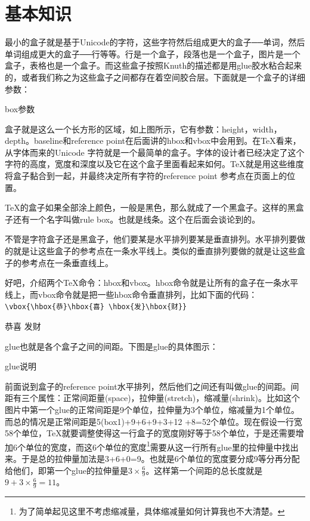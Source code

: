 \documentclass[11pt,oneside]{book}
\begin{document}
\section{基本知识}
最小的盒子就是基于Unicode的字符，这些字符然后组成更大的盒子──单词，然后单词组成更大的盒子──行等等。行是一个盒子，段落也是一个盒子，图片是一个盒子，表格也是一个盒子。而这些盒子按照Knuth的描述都是用glue胶水粘合起来的，或者我们称之为这些盒子之间都存在着空间胶合层。下面就是一个盒子的详细参数：

\begin{linefig}[0.8]{box参数}
\label{fig:box参数}
\end{linefig}

盒子就是这么一个长方形的区域，如上图所示，它有参数：height，width，depth。baseline和reference point在后面讲的hbox和vbox中会用到。在\TeX 看来，从字体而来的Unicode 字符就是一个最简单的盒子。字体的设计者已经决定了这个字符的高度，宽度和深度以及它在这个盒子里面看起来如何。\TeX 就是用这些维度将盒子黏合到一起，并最终决定所有字符的reference point 参考点在页面上的位置。

\TeX 的盒子如果全部涂上颜色，一般是黑色，那么就成了一个黑盒子。这样的黑盒子还有一个名字叫做rule box。也就是线条。这个在后面会谈论到的。

不管是字符盒子还是黑盒子，他们要某是水平排列要某是垂直排列。水平排列要做的就是让这些盒子的参考点在一条水平线上。类似的垂直排列要做的就是让这些盒子的参考点在一条垂直线上。

好吧，介绍两个\TeX 命令：hbox和vbox。hbox命令就是让所有的盒子在一条水平线上，而vbox命令就是把一些hbox命令垂直排列，比如下面的代码：\\
\verb+\vbox{\hbox{恭}\hbox{喜} \hbox{发}\hbox{财}}+

\vbox{\hbox{恭}\hbox{喜} \hbox{发}\hbox{财}}

glue也就是各个盒子之间的间距。下图是glue的具体图示：
\begin{linefig}{glue说明}
\label{fig:glue说明}
\end{linefig}
前面说到盒子的reference point水平排列，然后他们之间还有叫做glue的间距。间距有三个属性：正常间距量(space)，拉伸量(stretch)，缩减量(shrink)。比如这个图片中第一个glue的正常间距是9个单位，拉伸量为3个单位，缩减量为1个单位。而总的情况是正常间距是5(box1)+9+6+9+3+12\- +8=52个单位。现在假设一行宽58个单位，\TeX 就要调整使得这一行盒子的宽度刚好等于58个单位，于是还需要增加6个单位的宽度，而这6个单位的宽度\footnote{为了简单起见这里不考虑缩减量，具体缩减量如何计算我也不大清楚。}需要从这一行所有glue里的拉伸量中找出来。于是总的拉伸量加法是3+6+0=9。也就是6个单位的宽度要分成9等分再分配给他们，即第一个glue的拉伸量是$3\times\frac { 6 }{ 9 } $。这样第一个间距的总长度就是$9+3\times\frac { 6 }{ 9 } =11$。
\end{document}
